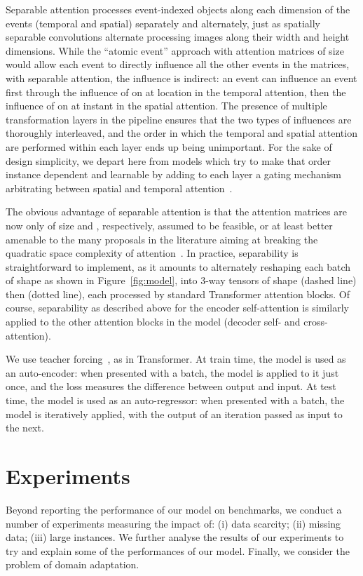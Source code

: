 \documentclass[a4paper]{article}
\begin{document}
Separable attention processes event-indexed objects along each dimension of the events (temporal and spatial) separately and alternately, just as spatially separable convolutions alternate processing images along their width and height dimensions. While the ``atomic event'' approach with attention matrices of size  would allow each event to directly influence all the other events in the matrices, with separable attention, the influence is indirect: an event  can influence an event  first through the influence of  on  at location  in the temporal attention, then the influence of  on  at instant  in the spatial attention. The presence of multiple transformation layers in the pipeline ensures that the two types of influences are thoroughly interleaved, and the order in which the temporal and spatial attention are performed within each layer ends up being unimportant. For the sake of design simplicity, we depart here from models which try to make that order instance dependent and learnable by adding to each layer a gating mechanism arbitrating between spatial and temporal attention~\cite{wu_graph_2019,kong_stgat_2020}.

The obvious advantage of separable attention is that the attention matrices are now only of size  and , respectively, assumed to be feasible, or at least better amenable to the many proposals in the literature aiming at breaking the quadratic space complexity of attention~\cite{tay_efficient_2020}. In practice, separability is straightforward to implement, as it amounts to alternately reshaping each batch of shape  as shown in Figure~\ref{fig:model}, into 3-way tensors of shape  (dashed line) then  (dotted line), each processed by standard Transformer attention blocks. Of course, separability as described above for the encoder self-attention is similarly applied to the other attention blocks in the model (decoder self- and cross-attention).

We use teacher forcing~\cite{williams_learning_1989}, as in Transformer. At train time, the model is used as an auto-encoder: when presented with a batch, the model is applied to it just once, and the loss measures the difference between output and input. At test time, the model is used as an auto-regressor: when presented with a batch, the model is iteratively applied, with the output of an iteration passed as input to the next.
\section{Experiments}
Beyond reporting the performance of our model on benchmarks, we conduct a number of experiments measuring the impact of: (i) data scarcity; (ii) missing data; (iii) large instances. We further analyse the results of our experiments to try and explain some of the performances of our model. Finally, we consider the problem of domain adaptation.
\end{document}
